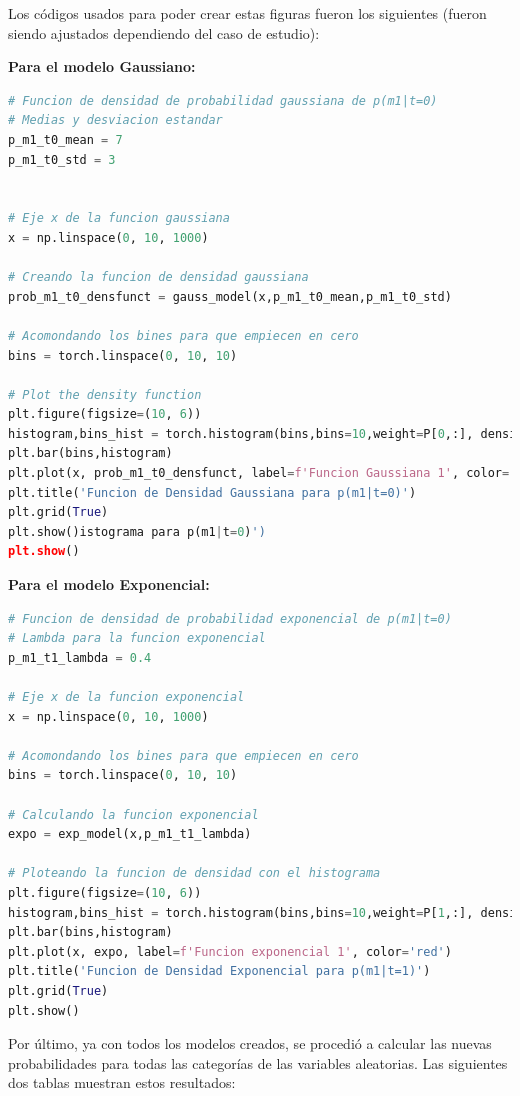 \documentclass[spanish,english]{article}
\begin{document}
\begin{enumerate}
\begin{enumerate}
\end{enumerate}

Los c\'{o}digos usados para poder crear estas figuras fueron los siguientes (fueron siendo ajustados dependiendo del caso de estudio):

\textbf{Para el modelo Gaussiano:}
\begin{lstlisting}[language=Python]
# Funcion de densidad de probabilidad gaussiana de p(m1|t=0)
# Medias y desviacion estandar
p_m1_t0_mean = 7
p_m1_t0_std = 3


# Eje x de la funcion gaussiana
x = np.linspace(0, 10, 1000)

# Creando la funcion de densidad gaussiana
prob_m1_t0_densfunct = gauss_model(x,p_m1_t0_mean,p_m1_t0_std)

# Acomondando los bines para que empiecen en cero
bins = torch.linspace(0, 10, 10)

# Plot the density function
plt.figure(figsize=(10, 6))
histogram,bins_hist = torch.histogram(bins,bins=10,weight=P[0,:], density=True)
plt.bar(bins,histogram)
plt.plot(x, prob_m1_t0_densfunct, label=f'Funcion Gaussiana 1', color='red')
plt.title('Funcion de Densidad Gaussiana para p(m1|t=0)')
plt.grid(True)
plt.show()istograma para p(m1|t=0)')
plt.show()
\end{lstlisting}

\textbf{Para el modelo Exponencial:}
\begin{lstlisting}[language=Python]
# Funcion de densidad de probabilidad exponencial de p(m1|t=0)
# Lambda para la funcion exponencial
p_m1_t1_lambda = 0.4

# Eje x de la funcion exponencial
x = np.linspace(0, 10, 1000)

# Acomondando los bines para que empiecen en cero
bins = torch.linspace(0, 10, 10)

# Calculando la funcion exponencial
expo = exp_model(x,p_m1_t1_lambda)

# Ploteando la funcion de densidad con el histograma
plt.figure(figsize=(10, 6))
histogram,bins_hist = torch.histogram(bins,bins=10,weight=P[1,:], density=True)
plt.bar(bins,histogram)
plt.plot(x, expo, label=f'Funcion exponencial 1', color='red')
plt.title('Funcion de Densidad Exponencial para p(m1|t=1)')
plt.grid(True)
plt.show()
\end{lstlisting}\newpage

Por \'{u}ltimo, ya con todos los modelos creados, se procedi\'{o} a calcular las nuevas probabilidades para todas las categor\'{i}as de las variables aleatorias. Las siguientes dos tablas muestran estos resultados:


\end{enumerate}
\end{document}
